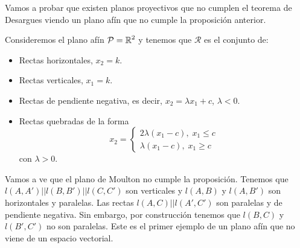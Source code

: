 Vamos a probar que existen planos proyectivos que no cumplen el teorema de Desargues viendo un plano afín que no cumple la proposición anterior. 
\begin{eg}
Consideremos el plano afín $\displaystyle \mathcal{P} = \mathbb{R}^{2} $ y tenemos que $\displaystyle \mathcal{R} $ es el conjunto de:
\begin{itemize}
\item Rectas horizontales, $\displaystyle x_{2} = k $.
\item Rectas verticales, $\displaystyle x_{1} = k $.
\item Rectas de pendiente negativa, es decir, $\displaystyle x_{2} = \lambda x_{1} + c $, $\displaystyle \lambda < 0 $.
\item Rectas quebradas de la forma 
	\[ x_{2} = 
	\begin{cases}
	2\lambda\left(x_{1}-c\right), \; x_{1} \leq c \\
	\lambda\left(x_{1}-c\right), \; x_{1} \geq c
	\end{cases}
	\]
	con $\displaystyle \lambda > 0 $.
\end{itemize}
Vamos a ve que el plano de Moulton no cumple la proposición. 
Tenemos que $\displaystyle l\left(A,A'\right) | | l\left(B,B'\right) | | l\left(C,C'\right) $ son verticales y $\displaystyle l\left(A,B\right) $ y $\displaystyle l\left(A,B'\right) $ son horizontales y paralelas. Las rectas $\displaystyle l\left(A,C\right) | | l\left(A',C'\right) $ son paralelas y de pendiente negativa. Sin embargo, por construcción tenemos que $\displaystyle l\left(B,C\right) $ y $\displaystyle l\left(B',C'\right) $ no son paralelas. Este es el primer ejemplo de un plano afín que no viene de un espacio vectorial. 
\end{eg}

